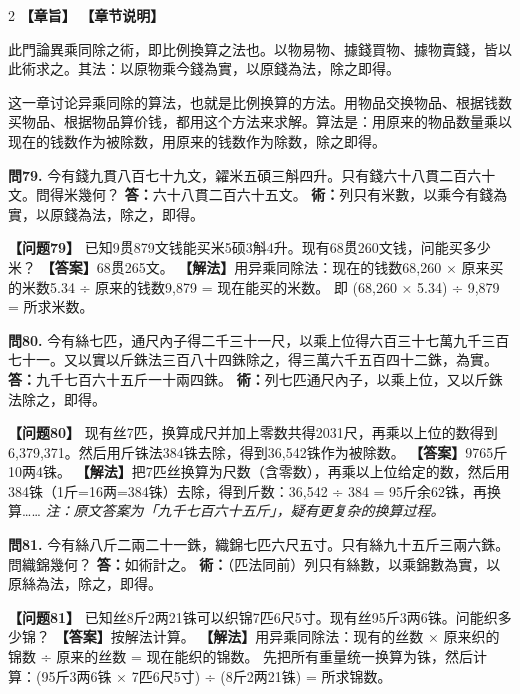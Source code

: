 \documentclass[11pt,a4paper]{article}
\begin{document}
\begin{paracol}{2}
\noindent\textbf{\textcolor{leftlabel}{【章旨】}}
\switchcolumn
\noindent\textbf{\textcolor{rightlabel}{【章节说明】}}
\switchcolumn*

此門論異乘同除之術，即比例換算之法也。以物易物、據錢買物、據物賣錢，皆以此術求之。其法：以原物乘今錢為實，以原錢為法，除之即得。

\switchcolumn

这一章讨论异乘同除的算法，也就是比例换算的方法。用物品交换物品、根据钱数买物品、根据物品算价钱，都用这个方法来求解。算法是：用原来的物品数量乘以现在的钱数作为被除数，用原来的钱数作为除数，除之即得。

\switchcolumn*

\textbf{問79.} 今有錢九貫八百七十九文，糴米五碩三斛四升。只有錢六十八貫二百六十文。問得米幾何？\break
\textbf{答：}六十八貫二百六十五文。\break
\textbf{術：}列只有米數，以乘今有錢為實，以原錢為法，除之，即得。

\switchcolumn

\textbf{【问题79】} 已知9贯879文钱能买米5硕3斛4升。现有68贯260文钱，问能买多少米？\break
\textbf{【答案】}68贯265文。\break
\textbf{【解法】}用异乘同除法：现在的钱数68,260 × 原来买的米数5.34 ÷ 原来的钱数9,879 = 现在能买的米数。\break
即 (68,260 × 5.34) ÷ 9,879 = 所求米数。

\switchcolumn*

\textbf{問80.} 今有絲七匹，通尺內子得二千三十一尺，以乘上位得六百三十七萬九千三百七十一。又以實以斤銖法三百八十四銖除之，得三萬六千五百四十二銖，為實。\break
\textbf{答：}九千七百六十五斤一十兩四銖。\break
\textbf{術：}列七匹通尺內子，以乘上位，又以斤銖法除之，即得。

\switchcolumn

\textbf{【问题80】} 现有丝7匹，换算成尺并加上零数共得2031尺，再乘以上位的数得到6,379,371。然后用斤铢法384铢去除，得到36,542铢作为被除数。\break
\textbf{【答案】}9765斤10两4铢。\break
\textbf{【解法】}把7匹丝换算为尺数（含零数），再乘以上位给定的数，然后用384铢（1斤=16两=384铢）去除，得到斤数：36,542 ÷ 384 = 95斤余62铢，再换算……\break
\textit{注：原文答案为「九千七百六十五斤」，疑有更复杂的换算过程。}

\switchcolumn*

\textbf{問81.} 今有絲八斤二兩二十一銖，織錦七匹六尺五寸。只有絲九十五斤三兩六銖。問織錦幾何？\break
\textbf{答：}如術計之。\break
\textbf{術：}（匹法同前）列只有絲數，以乘錦數為實，以原絲為法，除之，即得。

\switchcolumn

\textbf{【问题81】} 已知丝8斤2两21铢可以织锦7匹6尺5寸。现有丝95斤3两6铢。问能织多少锦？\break
\textbf{【答案】}按解法计算。\break
\textbf{【解法】}用异乘同除法：现有的丝数 × 原来织的锦数 ÷ 原来的丝数 = 现在能织的锦数。\break
先把所有重量统一换算为铢，然后计算：(95斤3两6铢 × 7匹6尺5寸) ÷ (8斤2两21铢) = 所求锦数。


\end{paracol}
\end{document}
